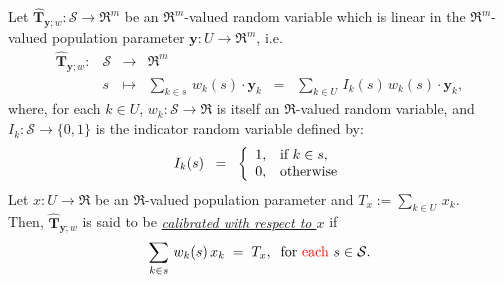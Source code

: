\documentclass{article}
\begin{document}
\begin{definition}
\mbox{}
\vskip 0.1cm
\noindent
Let $\widehat{\mathbf{T}}_{\mathbf{y};w} : \mathcal{S} \longrightarrow \Re^{m}$
be an $\Re^{m}$-valued random variable which is linear in the $\Re^{m}$-valued
population parameter $\mathbf{y} : U \longrightarrow \Re^{m}$, i.e.
\begin{equation*}
\begin{array}{cccl}
\widehat{\mathbf{T}}_{\mathbf{y};w} : & \mathcal{S} & \longrightarrow & \Re^{m} \\
     & s &\longmapsto & \underset{k\in s}{\sum}\,w_{k}(s)\cdot\mathbf{y}_{k} \;\; = \;\; \underset{k\in U}{\sum}\,I_{k}(s)\,w_{k}(s)\cdot\mathbf{y}_{k},
\end{array}
\end{equation*}
where, for each $k \in U$, $w_{k} : \mathcal{S} \longrightarrow \Re$ is itself an $\Re$-valued random variable,
and $I_{k} : \mathcal{S} \longrightarrow \{0,1\}$ is the indicator random variable defined by:
\begin{equation*}
I_{k}(s)
\;\;=\;\;
\left\{
\begin{array}{cl}
1, & \textnormal{if $k \in s$}, \\
0, & \textnormal{otherwise}
\end{array}
\right.
\end{equation*}
Let $x : U \longrightarrow \Re$ be an $\Re$-valued population parameter
and  $T_{x} := \underset{k\in U}{\sum}\,x_{k}$.\\
Then, $\widehat{\mathbf{T}}_{\mathbf{y};w}$ is said to be
\underline{\emph{calibrated with respect to $x$}} if
\begin{equation*}
\sum_{k \in s}\,w_{k}(s)\,x_{k} \; = \; T_{x},
\;\;\textnormal{for {\color{red}each} $s \in \mathcal{S}$}.
\end{equation*}
\end{definition}
\end{document}
